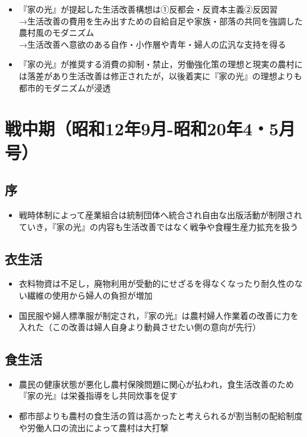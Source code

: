 \documentclass[11pt,autodetect-engine]{jsarticle}%
\begin{document}
 \begin{itemize}
  \item 『家の光』が提起した生活改善構想は①反都会・反資本主義②反因習
  \\→生活改善の費用を生み出すための自給自足や家族・部落の共同を強調した農村風のモダニズム
  \\→生活改善へ意欲のある自作・小作層や青年・婦人の広汎な支持を得る
  \item 『家の光』が推奨する消費の抑制・禁止，労働強化策の理想と現実の農村には落差があり生活改善は修正されたが，以後着実に『家の光』の理想よりも都市的モダニズムが浸透
\end{itemize}

\section{戦中期（昭和12年9月-昭和20年4・5月号） }

 \subsection{序 }
 
 \begin{itemize}
  \item 戦時体制によって産業組合は統制団体へ統合され自由な出版活動が制限されていき，『家の光』の内容も生活改善ではなく戦争や食糧生産力拡充を扱う
\end{itemize}

 \subsection{衣生活 }
 
 \begin{itemize}
  \item 衣料物資は不足し，廃物利用が受動的にせざるを得なくなったり耐久性のない繊維の使用から婦人の負担が増加
  \item 国民服や婦人標準服が制定され，『家の光』は農村婦人作業着の改善に力を入れた（この改善は婦人自身より動員させたい側の意向が先行）
\end{itemize}

 \subsection{食生活 }
 
 \begin{itemize}
  \item 農民の健康状態が悪化し農村保険問題に関心が払われ，食生活改善のため『家の光』は栄養指導をし共同炊事を促す
  \item 都市部よりも農村の食生活の質は高かったと考えられるが割当制の配給制度や労働人口の流出によって農村は大打撃
\end{itemize}
\end{document}
